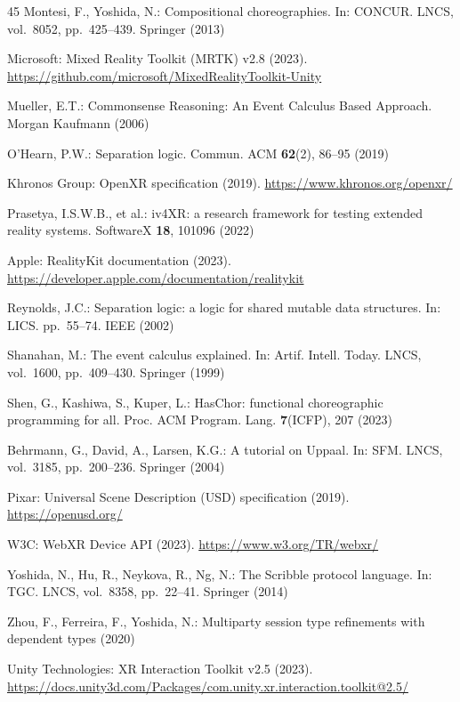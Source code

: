 \documentclass[11pt,a4paper]{article}
\begin{document}
\begin{thebibliography}{45}
Montesi, F., Yoshida, N.: Compositional choreographies.
In: CONCUR. LNCS, vol.~8052, pp.~425--439. Springer (2013)

Microsoft: Mixed Reality Toolkit (MRTK) v2.8 (2023).
\url{https://github.com/microsoft/MixedRealityToolkit-Unity}

Mueller, E.T.: Commonsense Reasoning: An Event Calculus Based Approach.
Morgan Kaufmann (2006)

O'Hearn, P.W.: Separation logic.
Commun. ACM \textbf{62}(2), 86--95 (2019)

Khronos Group: OpenXR specification (2019).
\url{https://www.khronos.org/openxr/}

Prasetya, I.S.W.B., et al.: iv4XR: a research framework for testing extended
reality systems. SoftwareX \textbf{18}, 101096 (2022)

Apple: RealityKit documentation (2023).
\url{https://developer.apple.com/documentation/realitykit}

Reynolds, J.C.: Separation logic: a logic for shared mutable data structures.
In: LICS. pp.~55--74. IEEE (2002)

Shanahan, M.: The event calculus explained.
In: Artif. Intell. Today. LNCS, vol.~1600, pp.~409--430. Springer (1999)

Shen, G., Kashiwa, S., Kuper, L.: HasChor: functional choreographic programming
for all. Proc. ACM Program. Lang. \textbf{7}(ICFP), 207 (2023)

Behrmann, G., David, A., Larsen, K.G.: A tutorial on Uppaal.
In: SFM. LNCS, vol.~3185, pp.~200--236. Springer (2004)

Pixar: Universal Scene Description (USD) specification (2019).
\url{https://openusd.org/}

W3C: WebXR Device API (2023).
\url{https://www.w3.org/TR/webxr/}

Yoshida, N., Hu, R., Neykova, R., Ng, N.:
The Scribble protocol language.
In: TGC. LNCS, vol.~8358, pp.~22--41. Springer (2014)

Zhou, F., Ferreira, F., Yoshida, N.:
Multiparty session type refinements with dependent types (2020)

Unity Technologies: XR Interaction Toolkit v2.5 (2023).
\url{https://docs.unity3d.com/Packages/com.unity.xr.interaction.toolkit@2.5/}


\end{thebibliography}
\end{document}
